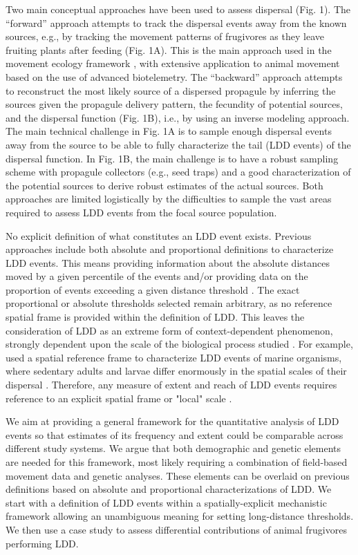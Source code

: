 \documentclass[a4paper, 12pt]{article}
\begin{document}
\begin{linenumbers}
Two main conceptual approaches have been used to assess dispersal (Fig. 1). The “forward” approach attempts to track the dispersal events away from the known sources, e.g., by tracking the movement patterns of frugivores as they leave fruiting plants after feeding (Fig. 1A). This is the main approach used in the movement ecology framework \citep{Nathan:2008fx}, with extensive application to animal movement based on the use of advanced biotelemetry. The “backward” approach attempts to reconstruct the most likely source of a dispersed propagule by inferring the sources given the propagule delivery pattern, the fecundity of potential sources, and the dispersal function (Fig. 1B), i.e., by using an inverse modeling approach. The main technical challenge in Fig. 1A is to sample enough dispersal events away from the source to be able to fully characterize the tail (LDD events) of the dispersal function. In Fig. 1B, the main challenge is to have a robust sampling scheme with propagule collectors (e.g., seed traps) and a good characterization of the potential sources to derive robust estimates of the actual sources. Both approaches are limited logistically by the difficulties to sample the vast areas required to assess LDD events from the focal source population.    

No explicit definition of what constitutes an LDD event exists. Previous approaches \citep[e.g., ][]{Nathan:2006aa,Schurr2009long} include both absolute and proportional definitions to characterize LDD events. This means providing information about the absolute distances moved by a given percentile of the events and/or providing data on the proportion of events exceeding a given distance threshold \citep{Nathan:2008is}. The exact proportional or absolute thresholds selected remain arbitrary, as no reference spatial frame is provided within the definition of LDD. This leaves the consideration of LDD as an extreme form of context-dependent phenomenon, strongly dependent upon the scale of the biological process studied \citep{Kinlan:2005fb}. For example, \cite{Kinlan:2005fb} used a spatial reference frame to characterize LDD events of marine organisms, where sedentary adults and larvae differ enormously in the spatial scales of their dispersal \citep{DAloia:2013fc}. Therefore, any measure of extent and reach of LDD events requires reference to an explicit spatial frame or "local" scale \citep{Kinlan:2005fb}.

We aim at providing a general framework for the quantitative analysis of LDD events so that estimates of its frequency and extent could be comparable across different study systems. We argue that both demographic and genetic elements are needed for this framework, most likely requiring a combination of field-based movement data and genetic analyses. These elements can be overlaid on previous definitions based on absolute and proportional characterizations of LDD. We start with a definition of LDD events within a spatially-explicit mechanistic framework allowing an unambiguous meaning for setting long-distance thresholds. We then use a case study to assess differential contributions of animal frugivores performing LDD.


\end{linenumbers}
\end{document}

